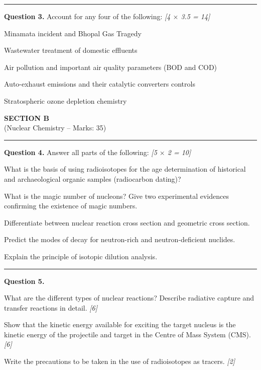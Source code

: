 \documentclass[11pt,a4paper]{article}
\newcommand{\pts}[1]{\hfill   \textit{[#1]}}
\begin{document}
\medskip\rule{\linewidth}{0.2pt}




\noindent   \textbf{Question 3.} Account for any four of the following: \pts{4 $ \times$ 3.5 = 14}

\begin{parts}
  \item Minamata incident and Bhopal Gas Tragedy
  \item Wastewater treatment of domestic effluents
  \item Air pollution and important air quality parameters (BOD and COD)
  \item Auto-exhaust emissions and their catalytic converters controls
  \item Stratospheric ozone depletion chemistry
\end{parts}


\newpage

\begin{center}
  {\large\bfseries SECTION B}\\[2pt]
  {\normalsize (Nuclear Chemistry -- Marks: 35)}
\end{center}
\rule{0.4\linewidth}{0.2pt}
\smallskip




\noindent   \textbf{Question 4.} Answer all parts of the following: \pts{5 $ \times$ 2 = 10}

\begin{parts}
  \item What is the basis of using radioisotopes for the age determination of historical and archaeological organic samples (radiocarbon dating)?
  \item What is the magic number of nucleons? Give two experimental evidences confirming the existence of magic numbers.
  \item Differentiate between nuclear reaction cross section and geometric cross section.
  \item Predict the modes of decay for neutron-rich and neutron-deficient nuclides.
  \item Explain the principle of isotopic dilution analysis.
\end{parts}

\medskip\rule{\linewidth}{0.2pt}




\noindent   \textbf{Question 5.}

\begin{parts}
  \item What are the different types of nuclear reactions? Describe radiative capture and transfer reactions in detail. \pts{6}
  \item Show that the kinetic energy available for exciting the target nucleus is the kinetic energy of the projectile and target in the Centre of Mass System (CMS). \pts{6}
  \item Write the precautions to be taken in the use of radioisotopes as tracers. \pts{2}
\end{parts}
\end{document}
